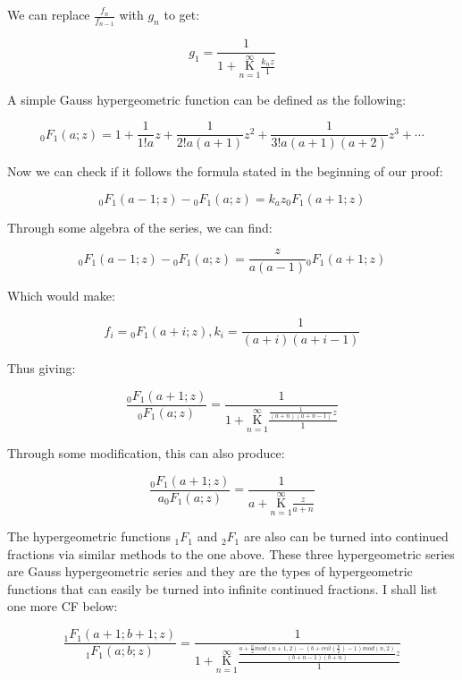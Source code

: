 \documentclass{article}
\begin{document}
We can replace $\frac{f_n}{f_{n-1}}$ with $g_n$ to get:

$$g_1= \frac{1}{1+\underset{n=1}{\overset{\infty}{ \mathrm K}} \frac{k_n z}{1}} $$

A simple Gauss hypergeometric function can be defined as the following:

$${}_0 F_1 (a;z) = 1+\frac{1}{1!a}z+\frac{1}{2!a(a+1)}z^2+ \frac{1}{3!a(a+1)(a+2)}z^3 + \cdots$$

Now we can check if it follows the formula stated in the beginning of our proof:

$${}_0 F_1 (a-1;z) - {}_0 F_1 (a;z) = k_a z {}_0 F_1 (a+1;z) $$

Through some algebra of the series, we can find:

$${}_0 F_1 (a-1;z) - {}_0 F_1 (a;z) = \frac{z}{a(a-1)} {}_0 F_1 (a+1;z) $$

Which would make:

$$f_i={}_0 F_1 (a+i;z), k_i = \frac{1}{(a+i)(a+i-1)}$$

Thus giving:

$$\frac{{}_0 F_1 (a+1;z)}{{}_0 F_1 (a;z)}=\frac{1}{1+ \underset{n=1}{\overset{\infty}{ \mathrm K}} \frac{\frac{1}{(a+n)(a+n-1)} z}{1}}$$

Through some modification, this can also produce:

$$\frac{{}_0 F_1 (a+1;z)}{a{}_0 F_1 (a;z)}=\frac{1}{a+ \underset{n=1}{\overset{\infty}{ \mathrm K}} \frac{z}{a+n}}$$

The hypergeometric functions ${}_1 F_1$ and ${}_2 F_1$ are also can be turned into continued fractions via similar methods to the one above. These three hypergeometric series are Gauss hypergeometric series and they are the types of hypergeometric functions that can easily be turned into infinite continued fractions. I shall list one more CF below:

$$\frac{{}_1 F_1 (a+1;b+1;z)}{{}_1 F_1 (a;b;z)}=\frac{1}{1+ \underset{n=1}{\overset{\infty}{ \mathrm K}} \frac{\frac{a+\frac{n}{2}mod(n+1,2)-(b+ceil(\frac{n}{2})-1)mod(n,2)}{(b+n-1)(b+n)}z}{1}}$$
\end{document}
